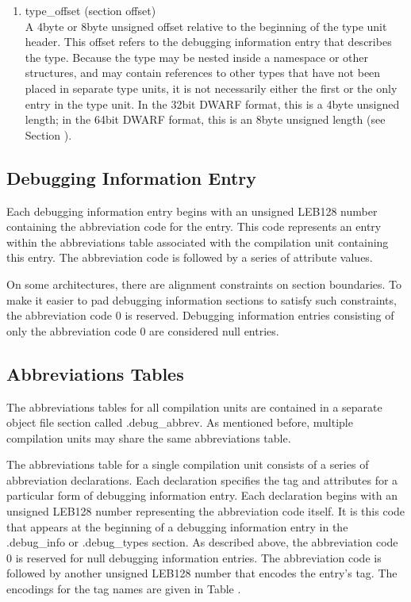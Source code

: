 \begin{enumerate}[1.]
\item type\_offset (section offset) \\
A 4\dash byte or 8\dash byte unsigned offset relative to the beginning
of the type unit header. This offset refers to the debugging
information entry that describes the type. Because the type
may be nested inside a namespace or other structures, and may
contain references to other types that have not been placed in
separate type units, it is not necessarily either the first or
the only entry in the type unit. In the 32\dash bit DWARF format,
this is a 4\dash byte unsigned length; in the 64\dash bit DWARF format,
this is an 8\dash byte unsigned length
(see Section ).

\end{enumerate}

\subsection{Debugging Information Entry}
\label{datarep:debugginginformationentry}

Each debugging information entry begins with an unsigned LEB128
number containing the abbreviation code for the entry. This
code represents an entry within the abbreviations table
associated with the compilation unit containing this entry. The
abbreviation code is followed by a series of attribute values.

On some architectures, there are alignment constraints on
section boundaries. To make it easier to pad debugging
information sections to satisfy such constraints, the
abbreviation code 0 is reserved. Debugging information entries
consisting of only the abbreviation code 0 are considered
null entries.

\subsection{Abbreviations Tables}
\label{datarep:abbreviationstables}

The abbreviations tables for all compilation units
are contained in a separate object file section called
.debug\_abbrev. As mentioned before, multiple compilation
units may share the same abbreviations table.

The abbreviations table for a single compilation unit consists
of a series of abbreviation declarations. Each declaration
specifies the tag and attributes for a particular form of
debugging information entry. Each declaration begins with
an unsigned LEB128 number representing the abbreviation
code itself. It is this code that appears at the beginning
of a debugging information entry in the .debug\_info or
.debug\_types section. As described above, the abbreviation
code 0 is reserved for null debugging information entries. The
abbreviation code is followed by another unsigned LEB128
number that encodes the entry’s tag. The encodings for the
tag names are given in 
Table .

